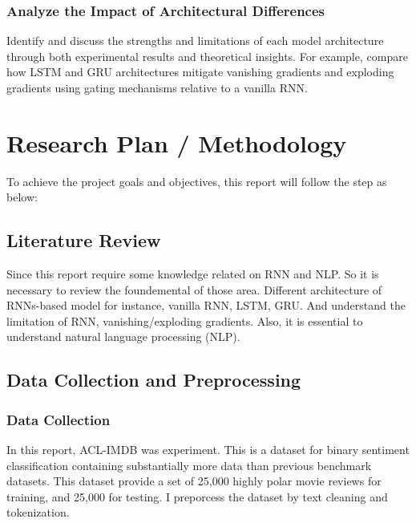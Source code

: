 \documentclass[12pt,a4paper]{article}
\begin{document}
\subsubsection{Analyze the Impact of Architectural Differences}
Identify and discuss the strengths and limitations of each model architecture through both experimental results and theoretical insights. For example, compare how LSTM and GRU architectures mitigate vanishing gradients and exploding gradients using gating mechanisms relative to a vanilla RNN.



\section{Research Plan / Methodology}
To achieve the project goals and objectives, this report will follow the step as below:
\subsection{Literature Review}
Since this report require some knowledge related on RNN and NLP. So it is necessary to review the foundemental of those area. Different architecture of RNNs-based model for instance, vanilla RNN, LSTM, GRU. And understand the limitation of RNN, vanishing/exploding gradients. Also, it is essential to understand natural language processing (NLP).  
\subsection{Data Collection and Preprocessing}
\subsubsection{Data Collection}
In this report, ACL-IMDB \parencite{maas-EtAl:2011:ACL-HLT2011} was experiment. This is a dataset for binary sentiment classification containing substantially more data than previous benchmark datasets. This dataset provide a set of 25,000 highly polar movie reviews for training, and 25,000 for testing. I preporcess the dataset by text cleaning and tokenization.
\end{document}
